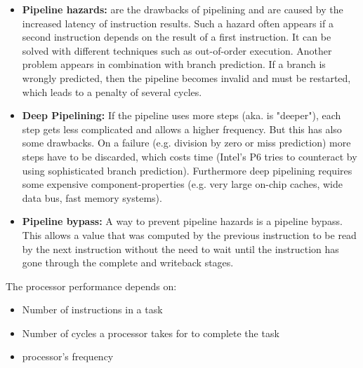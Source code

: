 \documentclass[a4paper,10pt]{article}
\begin{document}
\begin{description}
	\begin{itemize}

    \item \textbf{Pipeline hazards:} are the drawbacks of pipelining and are caused by the increased latency of
instruction results. Such a hazard often appears if a second instruction depends on the result of a first instruction. It can be solved
with different techniques such as out-of-order execution. Another problem appears in combination with branch prediction. If a branch is
wrongly predicted, then the pipeline becomes invalid and must be restarted, which leads to a penalty of several cycles.

    \item \textbf{Deep Pipelining:} If the pipeline uses more steps (aka. is "deeper"), each step gets less complicated and allows a higher frequency. But this has also some drawbacks. On a failure (e.g. division by zero or miss prediction) more steps have to be discarded, which costs time (Intel's P6 tries to counteract by using sophisticated branch prediction). Furthermore deep pipelining requires some expensive component-properties (e.g.  very large on-chip caches, wide data bus, fast memory systems)\cite{powerpc}.

    \item \textbf{Pipeline bypass:} A way to prevent pipeline hazards is a pipeline bypass. This allows a value that was computed by the
previous instruction to be read by the next instruction without the need to wait until the instruction has gone through the complete and
writeback stages.

	\end{itemize}

\end{description}


The processor performance depends on\cite{powerpc}:
\begin{itemize}
\item Number of instructions in a task
\item Number of cycles a processor takes for to complete the task
\item processor's frequency
\end{itemize}
\end{document}
